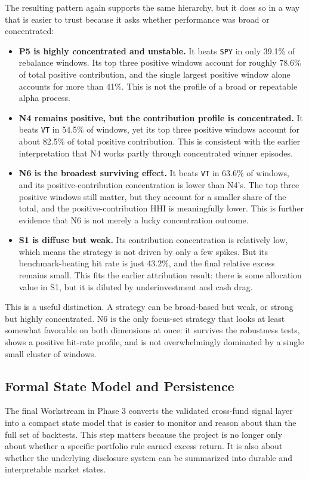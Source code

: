 \documentclass[conference]{IEEEtran}
\begin{document}
The resulting pattern again supports the same hierarchy, but it does so in a way that is easier to trust because it asks whether performance was broad or concentrated:
\begin{itemize}[leftmargin=1.4em]
    \item \textbf{P5 is highly concentrated and unstable.} It beats \texttt{SPY} in only 39.1\% of rebalance windows. Its top three positive windows account for roughly 78.6\% of total positive contribution, and the single largest positive window alone accounts for more than 41\%. This is not the profile of a broad or repeatable alpha process.
    \item \textbf{N4 remains positive, but the contribution profile is concentrated.} It beats \texttt{VT} in 54.5\% of windows, yet its top three positive windows account for about 82.5\% of total positive contribution. This is consistent with the earlier interpretation that N4 works partly through concentrated winner episodes.
    \item \textbf{N6 is the broadest surviving effect.} It beats \texttt{VT} in 63.6\% of windows, and its positive-contribution concentration is lower than N4's. The top three positive windows still matter, but they account for a smaller share of the total, and the positive-contribution HHI is meaningfully lower. This is further evidence that N6 is not merely a lucky concentration outcome.
    \item \textbf{S1 is diffuse but weak.} Its contribution concentration is relatively low, which means the strategy is not driven by only a few spikes. But its benchmark-beating hit rate is just 43.2\%, and the final relative excess remains small. This fits the earlier attribution result: there is some allocation value in S1, but it is diluted by underinvestment and cash drag.
\end{itemize}

This is a useful distinction. A strategy can be broad-based but weak, or strong but highly concentrated. N6 is the only focus-set strategy that looks at least somewhat favorable on both dimensions at once: it survives the robustness tests, shows a positive hit-rate profile, and is not overwhelmingly dominated by a single small cluster of windows.

\subsection{Formal State Model and Persistence}

The final Workstream in Phase 3 converts the validated cross-fund signal layer into a compact state model that is easier to monitor and reason about than the full set of backtests. This step matters because the project is no longer only about whether a specific portfolio rule earned excess return. It is also about whether the underlying disclosure system can be summarized into durable and interpretable market states.
\end{document}
